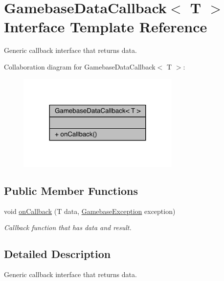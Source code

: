 \hypertarget{interfacecom_1_1toast_1_1android_1_1gamebase_1_1_gamebase_data_callback}{}\section{Gamebase\+Data\+Callback$<$ T $>$ Interface Template Reference}
\label{interfacecom_1_1toast_1_1android_1_1gamebase_1_1_gamebase_data_callback}


Generic callback interface that returns data.  




Collaboration diagram for Gamebase\+Data\+Callback$<$ T $>$\+:\nopagebreak
\begin{figure}[H]
\begin{center}
\leavevmode
\includegraphics[width=227pt]{interfacecom_1_1toast_1_1android_1_1gamebase_1_1_gamebase_data_callback__coll__graph}
\end{center}
\end{figure}
\subsection*{Public Member Functions}
\begin{DoxyCompactItemize}
\item 
void \hyperlink{interfacecom_1_1toast_1_1android_1_1gamebase_1_1_gamebase_data_callback_a6898f6f2398c6b6f84a4de7fca381e61}{on\+Callback} (T data, \hyperlink{classcom_1_1toast_1_1android_1_1gamebase_1_1base_1_1_gamebase_exception}{Gamebase\+Exception} exception)
\begin{DoxyCompactList}\small\item\em Callback function that has data and result. \end{DoxyCompactList}\end{DoxyCompactItemize}


\subsection{Detailed Description}
Generic callback interface that returns data. 

